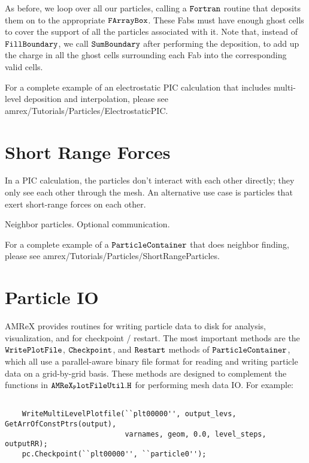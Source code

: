 As before, we loop over all our particles, calling a $\tt{Fortran}$ routine that deposits them on to the appropriate $\tt{FArrayBox}$. These Fabs must have enough ghost cells to
cover the support of all the particles associated with it. Note that, instead of $\tt{FillBoundary}$, we call $\tt{SumBoundary}$ after performing the deposition, to add up the charge 
in all the ghost cells surrounding each Fab into the corresponding valid cells.

For a complete example of an electrostatic PIC calculation that includes multi-level deposition and interpolation, please see amrex/Tutorials/Particles/ElectrostaticPIC.

\section{Short Range Forces}
\label{sec:Particles:ShortRange}

In a PIC calculation, the particles don't interact with each other directly; they only see each other through the mesh. An alternative use case is particles that exert short-range forces on each other. 

Neighbor particles. Optional communication.

For a complete example of a $\tt{ParticleContainer}$ that does neighbor finding, please see amrex/Tutorials/Particles/ShortRangeParticles.

\section{Particle IO}
\label{sec:Particles:IO}

AMReX provides routines for writing particle data to disk for analysis, visualization, and for checkpoint / restart. The most important methods are the $\tt{WritePlotFile}$, $\tt{Checkpoint}$, and $\tt{Restart}$ methods of $\tt{ParticleContainer}$, which all use a parallel-aware binary file format for reading and writing particle data on a grid-by-grid basis. These methods are designed to complement the functions in $\tt{AMReX_PlotFileUtil.H}$ for performing mesh data IO. For example:

\begin{lstlisting}[langauge=cpp]

    WriteMultiLevelPlotfile(``plt00000'', output_levs, GetArrOfConstPtrs(output),
                            varnames, geom, 0.0, level_steps, outputRR);
    pc.Checkpoint(``plt00000'', ``particle0'');

\end{lstlisting}


